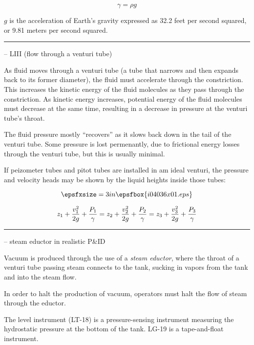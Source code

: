 $$\gamma = \rho g$$

$g$ is the acceleration of Earth's gravity expressed as 32.2 feet per second squared, or 9.81 meters per second squared.


\filbreak \vskip 5pt \hrule \vskip 5pt  -- LIII (flow through a venturi tube) \vskip 10pt

As fluid moves through a venturi tube (a tube that narrows and then expands back to its former diameter), the fluid must accelerate through the constriction.  This increases the kinetic energy of the fluid molecules as they pass through the constriction.  As kinetic energy increases, potential energy of the fluid molecules must decrease at the same time, resulting in a decrease in pressure at the venturi tube's throat.

\vskip 10pt

The fluid pressure mostly ``recovers'' as it slows back down in the tail of the venturi tube.  Some pressure is lost permenantly, due to frictional energy losses through the venturi tube, but this is usually minimal.

\vskip 10pt

If peizometer tubes and pitot tubes are installed in am ideal venturi, the pressure and velocity heads may be shown by the liquid heights inside those tubes:

$$\epsfxsize=3in \epsfbox{i04036x01.eps}$$

$$z_1 + {v_1^2 \over {2 g}} + {P_1 \over \gamma} = z_2 + {v_2^2 \over {2 g}} + {P_2 \over \gamma} = z_3 + {v_3^2 \over {2 g}} + {P_3 \over \gamma}$$


\filbreak \vskip 5pt \hrule \vskip 5pt  -- steam eductor in realistic P\&ID \vskip 10pt

Vacuum is produced through the use of a {\it steam eductor}, where the throat of a venturi tube passing steam connects to the tank, sucking in vapors from the tank and into the steam flow.  

\vskip 10pt

In order to halt the production of vacuum, operators must halt the flow of steam through the eductor.

\vskip 10pt

The level instrument (LT-18) is a pressure-sensing instrument measuring the hydrostatic pressure at the bottom of the tank.  LG-19 is a tape-and-float instrument.


